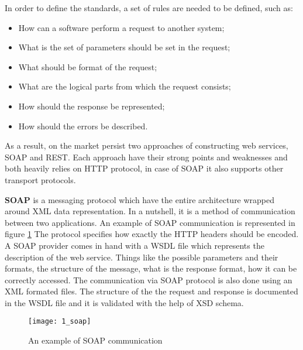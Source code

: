 In order to define the standards, a set of rules are needed to be defined, such as:
\begin{itemize}
    \item How can a software perform a request to another system;
    \item What is the set of parameters should be set in the request;
    \item What should be format of the request;
    \item What are the logical parts from which the request consists;
    \item How should the response be represented;
    \item How should the errors be described.
\end{itemize}

As a result, on the market persist two approaches of constructing web services, SOAP and REST. Each approach have their strong points and weaknesses and both heavily relies on HTTP protocol, in case of SOAP it also supports other transport protocols.

\textbf{SOAP} is a messaging protocol which have the entire architecture wrapped around XML data representation. In a nutshell, it is a method of communication between two applications. An example of SOAP communication is represented in figure \ref{soap} The protocol specifies how exactly the HTTP headers should be encoded. A SOAP provider comes in hand with a WSDL file which represents the description of the web service. Things like the possible parameters and their formats, the structure of the message, what is the response format, how it can be correctly accessed. The communication via SOAP protocol is also done using an XML formated files. The structure of the the request and response is documented in the WSDL file and it is validated with the help of XSD schema.

\begin{figure}[!ht]
\centering
\texttt{[image: 1\_soap]}
\caption{An example of SOAP communication}\label{soap}
\end{figure}


